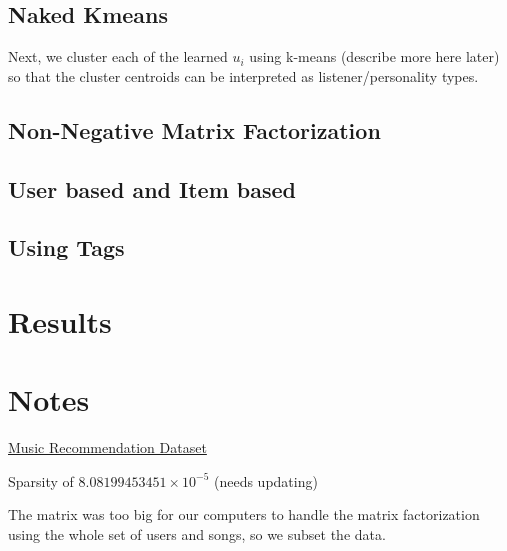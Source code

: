 \documentclass[12pt,preprint]{aastex}
\begin{document}
%

\subsection{Naked Kmeans }
Next, we cluster each of the learned $u_i$ using k-means (describe more here later) so that the cluster centroids can be interpreted as listener/personality types.


\subsection{Non-Negative Matrix Factorization}

\subsection{User based and Item based}

\subsection{Using Tags}


\section{Results}



\section{Notes}

\href{http://www.dtic.upf.edu/~ocelma/MusicRecommendationDataset/}{Music Recommendation Dataset}

Sparsity of $8.08199453451\times 10^{-5}$ (needs updating)

The matrix was too big for our computers to handle the matrix factorization using the whole set of users and songs, so we subset the data. 
\end{document}
